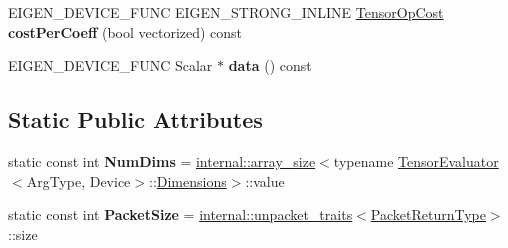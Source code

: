 \begin{DoxyCompactItemize}
E\+I\+G\+E\+N\+\_\+\+D\+E\+V\+I\+C\+E\+\_\+\+F\+U\+NC E\+I\+G\+E\+N\+\_\+\+S\+T\+R\+O\+N\+G\+\_\+\+I\+N\+L\+I\+NE \hyperlink{class_eigen_1_1_tensor_op_cost}{Tensor\+Op\+Cost} {\bfseries cost\+Per\+Coeff} (bool vectorized) const
\item 
\mbox{\label{struct_eigen_1_1_tensor_evaluator_3_01const_01_tensor_striding_op_3_01_strides_00_01_arg_type_01_4_00_01_device_01_4_a9d534166669015048106b56f7ca1aa96}} 
E\+I\+G\+E\+N\+\_\+\+D\+E\+V\+I\+C\+E\+\_\+\+F\+U\+NC Scalar $\ast$ {\bfseries data} () const
\end{DoxyCompactItemize}
\subsection*{Static Public Attributes}
\begin{DoxyCompactItemize}
\item 
\mbox{\label{struct_eigen_1_1_tensor_evaluator_3_01const_01_tensor_striding_op_3_01_strides_00_01_arg_type_01_4_00_01_device_01_4_af04105490f67770e12f409cda918e34a}} 
static const int {\bfseries Num\+Dims} = \hyperlink{struct_eigen_1_1internal_1_1array__size}{internal\+::array\+\_\+size}$<$typename \hyperlink{struct_eigen_1_1_tensor_evaluator}{Tensor\+Evaluator}$<$Arg\+Type, Device$>$\+::\hyperlink{struct_eigen_1_1_d_sizes}{Dimensions}$>$\+::value
\item 
\mbox{\label{struct_eigen_1_1_tensor_evaluator_3_01const_01_tensor_striding_op_3_01_strides_00_01_arg_type_01_4_00_01_device_01_4_a6425531c11ef0846d9d95cee9f5aa3be}} 
static const int {\bfseries Packet\+Size} = \hyperlink{struct_eigen_1_1internal_1_1unpacket__traits}{internal\+::unpacket\+\_\+traits}$<$\hyperlink{group___sparse_core___module}{Packet\+Return\+Type}$>$\+::size
\end{DoxyCompactItemize}
